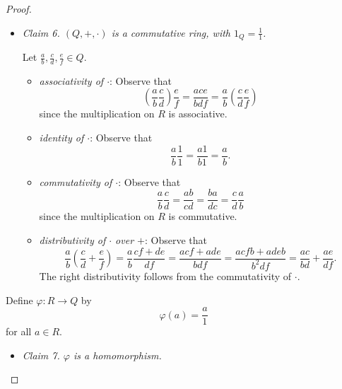 \documentclass[pmath347]{subfiles}
\begin{document}
\begin{proof}
\begin{itemize}
            \item \textit{Claim 6. $\left( Q,+,\cdot \right)$ is a commutative ring, with $1_Q = \frac{1}{1}$.}

                \begin{subproof}
                    Let $\frac{a}{b},\frac{c}{d},\frac{e}{f}\in Q$.
                    \begin{itemize}
                        \item \textit{associativity of $\cdot$}: Observe that
                            \begin{equation*}
                                \left( \frac{a}{b}\frac{c}{d} \right) \frac{e}{f} = \frac{ace}{bdf} = \frac{a}{b}\left( \frac{c}{d}\frac{e}{f} \right) 
                            \end{equation*}
                            since the multiplication on $R$ is associative.
                        \item \textit{identity of $\cdot$}: Observe that
                            \begin{equation*}
                                \frac{a}{b}\frac{1}{1} = \frac{a1}{b1} = \frac{a}{b}.
                            \end{equation*}
                        \item \textit{commutativity of $\cdot$}: Observe that
                            \begin{equation*}
                                \frac{a}{b}\frac{c}{d} = \frac{ab}{cd} = \frac{ba}{dc} = \frac{c}{d}\frac{a}{b}
                            \end{equation*}
                            since the multiplication on $R$ is commutative.
                        \item \textit{distributivity of $\cdot$ over $+$}: Observe that
                            \begin{equation*}
                                \frac{a}{b}\left( \frac{c}{d}+\frac{e}{f} \right) = \frac{a}{b}\frac{cf+de}{df} = \frac{acf+ade}{bdf} = \frac{acfb+adeb}{b^{2} df} = \frac{ac}{bd}+\frac{ae}{df}.
                            \end{equation*}
                            The right distributivity follows from the commutativity of $\cdot$. \qqqedsym
                    \end{itemize} 
                \end{subproof}
        \end{itemize} 
        Define $\varphi:R\to Q$ by
        \begin{equation*}
            \varphi\left( a \right) = \frac{a}{1}
        \end{equation*}
        for all $a\in R$.
        \begin{itemize}
            \item \textit{Claim 7. $\varphi$ is a homomorphism.}


\end{itemize}
\end{proof}
\end{document}
